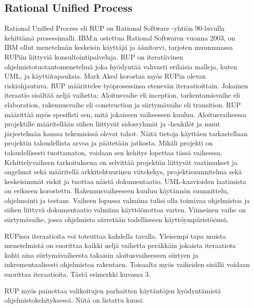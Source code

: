 \documentclass[finnish,12pt]{tktltiki2}
\theoremstyle{definition}
\theoremstyle{remark}
\begin{document}
 
\subsection{Rational Unified Process}

Rational Unified Process eli RUP on Rational Software -yhtiön 90-luvulla kehittämä prosessimalli. IBM:n ostettua Rational Softwaren vuonna 2003, on IBM ollut menetelmän keskeisin käyttäjä ja äänitorvi, tarjoten muunmuassa RUPiin liittyviä konsultointipalveluja. 
RUP on iteratiivinen ohjelmistotuotantomenetelmä joka hyödyntää vahvasti erilaisia malleja, kuten UML, ja käyttötapauksia\cite{Ruparelia:2010:SDL:1764810.1764814}. Mark Aked korostaa myös RUPin olevan riskiohjautuva\cite{Aked03}.
RUP määrittelee työprosessinsa etenevän iteraatioittain. Jokainen iteraatio sisältää neljä vaihetta: Aloitusvaihe eli inception, tarkentamisvaihe eli elaboration, rakennusvaihe eli construction ja siirtymävaihe eli transition. RUP määrittää myös spesifisti sen, mitä jokaiseen vaiheeseen kuuluu. 
Aloitusvaiheessa projektille määritellään siihen liittyvät sidosryhmät ja -henkilöt ja muut järjestelmän kanssa tekemisissä olevat tahot. Näitä tietoja käyttäen tarkastellaan projektin taloudellista arvoa ja päätetään jatkosta. Mikäli projekti on taloudellisesti tuottamaton, voidaan sen kehitys lopettaa tässä vaiheessa. 
Kehittelyvaiheen tarkoituksena on selvittää projektiin liittyvät vaatimukset ja ongelmat sekä määritellä arkkitehtuurinen viitekehys, projektisuunnitelma sekä keskeisimmät riskit ja tuottaa näistä dokumentaatio. UML-kaavioiden laatimista on erikseen korostettu.
Rakennusvaiheeseen kuuluu käytännön suunnittelu, ohjelmointi ja testaus. Vaiheen lopussa valmiina tulisi olla toimivaa ohjelmistoa ja siihen liittyvä dokumentaatio valmiina käyttöönottoa varten.
Viimeinen vaihe on siirtymävaihe, jossa ohjelmisto siirretään todelliseeen käyttöympäristöönsä.



RUPissa iteraatioita voi toteuttaa kahdella tavalla. Yleisempi tapa muista menetelmistä on suorittaa kaikki neljä vaihetta peräkkäin jokaista iteraatiota kohti aina siirtymävaiheesta takaisin aloitusvaiheeseen siirtyen ja inkrementaalisesti ohjelmistoa rakentaen. Toisaalta myös vaiheiden sisällä voidaan suorittaa iteraatioita. Tästä esimerkki kuvassa 3.

RUP myös painottaa valikoitujen parhaitten käytäntöjen hyödyntämistä ohjelmistokehityksessä. Niitä on listattu kuusi\cite{rational01}: 
\end{document}
